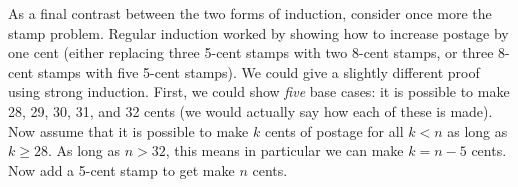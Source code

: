 \documentclass[10pt,]{book}
\theoremstyle{plain}
\theoremstyle{definition}
\theoremstyle{definition}
\theoremstyle{definition}
\numberwithin{equation}{chapter}
\newcommand{\lt}{<}
\begin{document}
As a final contrast between the two forms of induction, consider once more the stamp problem. Regular induction worked by showing how to increase postage by one cent (either replacing three 5-cent stamps with two 8-cent stamps, or three 8-cent stamps with five 5-cent stamps). We could give a slightly different proof using strong induction. First, we could show \emph{five} base cases: it is possible to make 28, 29, 30, 31, and 32 cents (we would actually say how each of these is made). Now assume that it is possible to make \(k\) cents of postage for all \(k \lt  n\) as long as \(k \ge 28\). As long as \(n > 32\), this means in particular we can make \(k = n-5\) cents. Now add a 5-cent stamp to get make \(n\) cents.%
\typeout{************************************************}
\typeout{************************************************}
\end{document}
